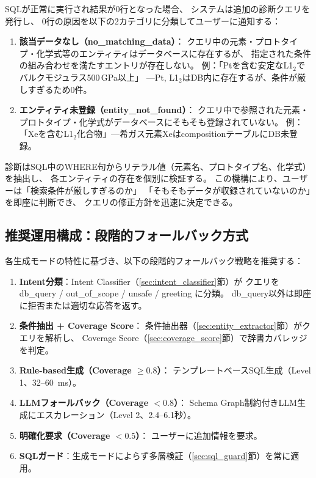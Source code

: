 \documentclass[5p,twocolumn]{elsarticle}
\begin{document}
SQLが正常に実行され結果が0行となった場合、
システムは追加の診断クエリを発行し、
0行の原因を以下の2カテゴリに分類してユーザーに通知する：

\begin{enumerate}
  \item \textbf{該当データなし（no\_matching\_data）}：
    クエリ中の元素・プロトタイプ・化学式等のエンティティはデータベースに存在するが、
    指定された条件の組み合わせを満たすエントリが存在しない。
    例：「Ptを含む安定なL1$_2$でバルクモジュラス500\,GPa以上」
    ---Pt, L1$_2$はDB内に存在するが、条件が厳しすぎるため0件。
  \item \textbf{エンティティ未登録（entity\_not\_found）}：
    クエリ中で参照された元素・プロトタイプ・化学式がデータベースにそもそも登録されていない。
    例：「Xeを含むL1$_2$化合物」---希ガス元素XeはcompositionテーブルにDB未登録。
\end{enumerate}

診断はSQL中のWHERE句からリテラル値（元素名、プロトタイプ名、化学式）を抽出し、
各エンティティの存在を個別に検証する。
この機構により、ユーザーは「検索条件が厳しすぎるのか」
「そもそもデータが収録されていないのか」を即座に判断でき、
クエリの修正方針を迅速に決定できる。

\subsection{推奨運用構成：段階的フォールバック方式}
\label{sec:cascade}

各生成モードの特性に基づき、以下の段階的フォールバック戦略を推奨する：

\begin{enumerate}
  \item \textbf{Intent分類}：Intent Classifier（\ref{sec:intent_classifier}節）が
    クエリをdb\_query / out\_of\_scope / unsafe / greeting に分類。
    db\_query以外は即座に拒否または適切な応答を返す。
  \item \textbf{条件抽出 + Coverage Score}：
    条件抽出器（\ref{sec:entity_extractor}節）がクエリを解析し、
    Coverage Score（\ref{sec:coverage_score}節）で辞書カバレッジを判定。
  \item \textbf{Rule-based生成（Coverage $\geq 0.8$）}：
    テンプレートベースSQL生成（Level 1、32--60~ms）。
  \item \textbf{LLMフォールバック（Coverage $< 0.8$）}：
    Schema Graph制約付きLLM生成にエスカレーション（Level 2、2.4--6.1秒）。
  \item \textbf{明確化要求（Coverage $< 0.5$）}：
    ユーザーに追加情報を要求。
  \item \textbf{SQLガード}：生成モードによらず多層検証（\ref{sec:sql_guard}節）を常に適用。
\end{enumerate}
\end{document}
